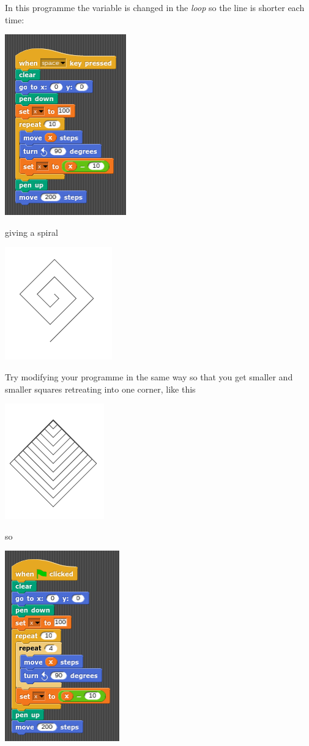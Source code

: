 \documentclass[11pt,a4paper]{scrartcl}
\begin{document}
In this programme the variable is changed in the \textsl{loop} so the
line is shorter each time:
\begin{center}
\includegraphics{spiral.png}
\end{center}
giving a spiral
\begin{center}
\includegraphics{spiral_pic.png}
\end{center}
Try modifying your programme in the same way so that you get smaller and smaller squares retreating into one corner, like this
\begin{center}
\includegraphics{repeat_squares_pic.png}
\end{center}
so
\begin{center}
\includegraphics{repeat_squares.png}
\end{center}
\end{document}
